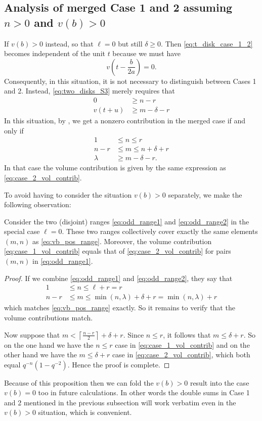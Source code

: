 \subsection{Analysis of merged Case 1 and 2 assuming $n > 0$ and $v(b) > 0$}
If $v(b) > 0$ instead, so that $\ell = 0$ but still $\delta \ge 0$.
Then \eqref{eq:t_disk_case_1_2} becomes independent of the unit $t$ because we must have
\[ v\left( t - \frac{b}{2a} \right) = 0. \]
Consequently, in this situation, it is not necessary to distinguish between Cases 1 and 2.
Instead, \eqref{eq:two_disks_S3} merely requires that
\begin{align*}
  0 &\ge n - r \\
  v(t+u) &\ge m - \delta - r
\end{align*}
In this situation, by ,
we get a nonzero contribution in the merged case if and only if
\begin{equation}
  \begin{aligned}
    1 &\le n \le r \\
    n-r &\le m \le n + \delta + r \\
    \lambda &\ge m - \delta - r.
  \end{aligned}
  \label{eq:vb_pos_range}
\end{equation}
In that case the volume contribution is given by the same expression as \eqref{eq:case_2_vol_contrib}.

To avoid having to consider the situation $v(b) > 0$ separately,
we make the following observation:
\begin{lemma}
  Consider the two (disjoint) ranges \eqref{eq:odd_range1} and \eqref{eq:odd_range2}
  in the special case $\ell = 0$.
  These two ranges collectively cover exactly the same elements $(m,n)$
  as \eqref{eq:vb_pos_range}.
  Moreover, the volume contribution \eqref{eq:case_1_vol_contrib}
  equals that of \eqref{eq:case_2_vol_contrib} for pairs $(m,n)$ in \eqref{eq:odd_range1}.
  \label{prop:folding_cases_1_2}
\end{lemma}
\begin{proof}
  If we combine \eqref{eq:odd_range1} and \eqref{eq:odd_range2}, they say that
  \begin{align*}
    1 &\le n \le \ell + r = r \\
    n-r &\le m \le \min(n,\lambda) + \delta + r = \min(n, \lambda) + r
  \end{align*}
  which matches \eqref{eq:vb_pos_range} exactly.
  So it remains to verify that the volume contributions match.

  Now suppose that $m < \left\lceil \frac{n-r}{2} \right\rceil + \delta + r$.
  Since $n \le r$, it follows that $m \le \delta + r$.
  So on the one hand we have the $n \le r$ case in \eqref{eq:case_1_vol_contrib}
  and on the other hand we have the $m \le \delta + r$ case in \eqref{eq:case_2_vol_contrib},
  which both equal $q^{-n}(1-q^{-2})$.
  Hence the proof is complete.
\end{proof}
Because of this proposition then we can fold the $v(b) > 0$
result into the case $v(b) = 0$ too in future calculations.
In other words the double sums in Case 1 and 2 mentioned in the previous subsection
will work verbatim even in the $v(b) > 0$ situation, which is convenient.

